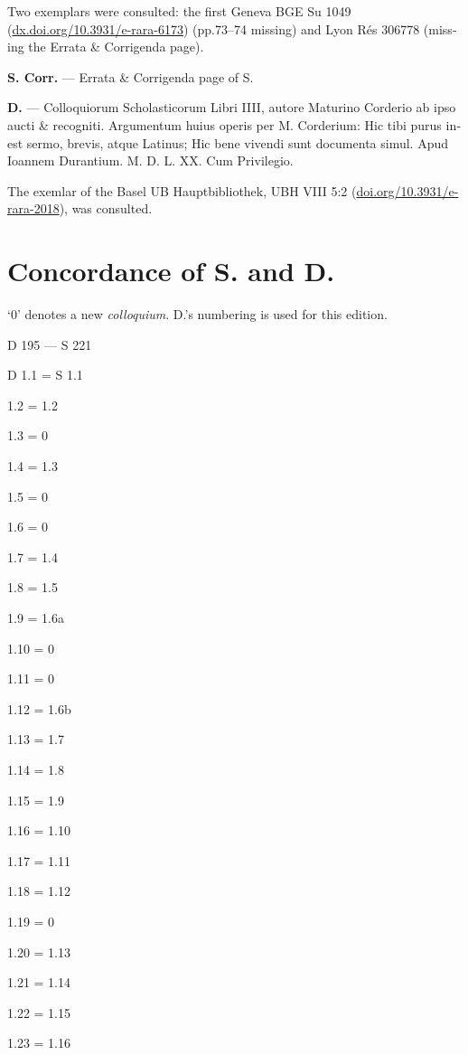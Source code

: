 \documentclass{article}
\begin{document}
\begin{english}
\begin{description}
Two exemplars were consulted: the first Geneva BGE Su 1049 (\url{dx.doi.org/10.3931/e-rara-6173}) (pp.73--74 missing) and Lyon Rés 306778 (missing the Errata \& Corrigenda page).

\item \textbf{S. Corr.} --- Errata \& Corrigenda page of S.

\item \textbf{D.} --- Colloquiorum Scholasticorum Libri IIII, autore Maturino Corderio ab ipso aucti \& recogniti. Argumentum huius operis per M. Corderium: Hic tibi purus inest sermo, brevis, atque Latinus; Hic bene vivendi sunt documenta simul. Apud Ioannem Durantium. M. D. L. XX. Cum Privilegio.

The exemlar of the Basel UB Hauptbibliothek, UBH VIII 5:2 (\url{doi.org/10.3931/e-rara-2018}), was consulted.
\end{description}

{}
\section*{Concordance of S. and D.}
`0' denotes a new \emph{colloquium}. D.'s numbering is used for this edition.
\setlength{\parindent}{0em}
\begin{multicols}{4}
D 195 --- S 221

D 1.1 = S 1.1

1.2 = 1.2

1.3 = 0

1.4 = 1.3

1.5 = 0

1.6 = 0

1.7 = 1.4

1.8 = 1.5

1.9 = 1.6a

1.10 = 0

1.11 = 0

1.12 = 1.6b

1.13 = 1.7

1.14 = 1.8

1.15 = 1.9

1.16 = 1.10

1.17 = 1.11

1.18 = 1.12

1.19 = 0

1.20 = 1.13

1.21 = 1.14

1.22 = 1.15

1.23 = 1.16


\end{multicols}
\end{english}
\end{document}
